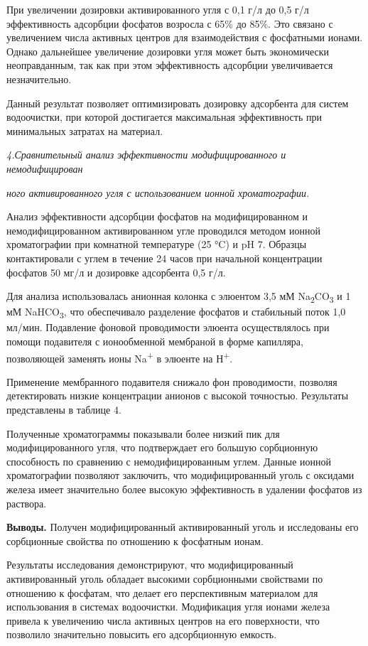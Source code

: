 \begin{multicols}{2}
При увеличении дозировки активированного угля с 0,1 г/л до 0,5 г/л
эффективность адсорбции фосфатов возросла с 65\% до 85\%. Это связано с
увеличением числа активных центров для взаимодействия с фосфатными
ионами. Однако дальнейшее увеличение дозировки угля может быть
экономически неоправданным, так как при этом эффективность адсорбции
увеличивается незначительно.

Данный результат позволяет оптимизировать дозировку адсорбента для
систем водоочистки, при которой достигается максимальная эффективность
при минимальных затратах на материал.

\emph{4.Сравнительный анализ эффективности модифицированного и
немодифицирован}

\emph{ного активированного угля с использованием ионной хроматографии.}

Анализ эффективности адсорбции фосфатов на модифицированном и
немодифицированном активированном угле проводился методом ионной
хроматографии при комнатной температуре (25 °C) и pH 7. Образцы
контактировали с углем в течение 24 часов при начальной концентрации
фосфатов 50 мг/л и дозировке адсорбента 0,5 г/л.

Для анализа использовалась анионная колонка с элюентом 3,5 мМ
Na\textsubscript{2}CO\textsubscript{3} и 1 мМ NaHCO\textsubscript{3},
что обеспечивало разделение фосфатов и стабильный поток 1,0 мл/мин.
Подавление фоновой проводимости элюента осуществлялось при помощи
подавителя с ионообменной мембраной в форме капилляра, позволяющей
заменять ионы Na\textsuperscript{+} в элюенте на Н\textsuperscript{+}.

Применение мембранного подавителя снижало фон проводимости, позволяя
детектировать низкие концентрации анионов с высокой точностью.
Результаты представлены в таблице 4.

Полученные хроматограммы показывали более низкий пик для
модифицированного угля, что подтверждает его большую сорбционную
способность по сравнению с немодифицированным углем. Данные ионной
хроматографии позволяют заключить, что модифицированный уголь с оксидами
железа имеет значительно более высокую эффективность в удалении фосфатов
из раствора.

{\bfseries Выводы.} Получен модифицированный активированный уголь и
исследованы его сорбционные свойства по отношению к фосфатным ионам.

Результаты исследования демонстрируют, что модифицированный
активированный уголь обладает высокими сорбционными свойствами по
отношению к фосфатам, что делает его перспективным материалом для
использования в системах водоочистки. Модификация угля ионами железа
привела к увеличению числа активных центров на его поверхности, что
позволило значительно повысить его адсорбционную емкость.


\end{multicols}
